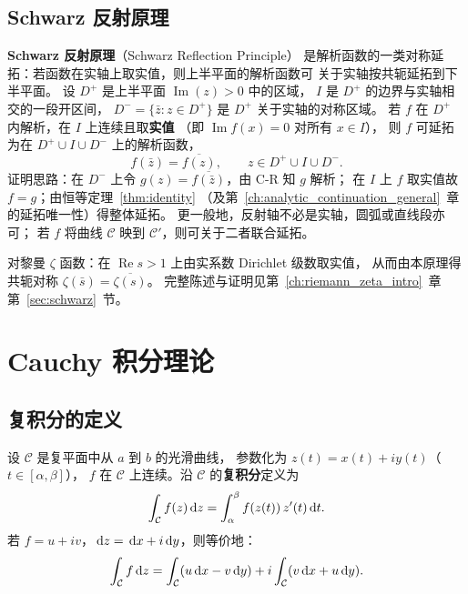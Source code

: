 \subsection{Schwarz 反射原理}\label{sec:schwarz_reflection}

\label{thm:schwarz_reflection}
\textbf{Schwarz 反射原理}（Schwarz Reflection Principle）
是解析函数的一类对称延拓：若函数在实轴上取实值，则上半平面的解析函数可
关于实轴按共轭延拓到下半平面。
设 $D^+$ 是上半平面 $\operatorname{Im}(z)>0$ 中的区域，
$I$ 是 $D^+$ 的边界与实轴相交的一段开区间，
$D^- = \{\bar{z}: z\in D^+\}$ 是 $D^+$ 关于实轴的对称区域。
若 $f$ 在 $D^+$ 内解析，在 $I$ 上连续且取\textbf{实值}
（即 $\operatorname{Im}f(x)=0$ 对所有 $x\in I$），
则 $f$ 可延拓为在 $D^+\cup I\cup D^-$ 上的解析函数，
\begin{equation}
    f(\bar{z}) = \overline{f(z)}, \qquad z\in D^+\cup I\cup D^-.
  \label{eq:schwarz_reflection}
\end{equation}
证明思路：在 $D^-$ 上令 $g(z)=\overline{f(\bar{z})}$，由 C-R 知 $g$ 解析；
在 $I$ 上 $f$ 取实值故 $f=g$；由恒等定理~\ref{thm:identity}
（及第~\ref{ch:analytic_continuation_general}~章的延拓唯一性）得整体延拓。
更一般地，反射轴不必是实轴，圆弧或直线段亦可；
若 $f$ 将曲线 $\mathcal{C}$ 映到 $\mathcal{C}'$，则可关于二者联合延拓。

对黎曼 $\zeta$ 函数：在 $\operatorname{Re}s>1$ 上由实系数 Dirichlet 级数取实值，
从而由本原理得共轭对称 $\zeta(\bar{s})=\overline{\zeta(s)}$。
完整陈述与证明见第~\ref{ch:riemann_zeta_intro}~章第~\ref{sec:schwarz}~节。

\section{Cauchy 积分理论}


\subsection{复积分的定义}

设 $\mathcal{C}$ 是复平面中从 $a$ 到 $b$ 的光滑曲线，
参数化为 $z(t)=x(t)+iy(t)$（$t\in[\alpha,\beta]$），
$f$ 在 $\mathcal{C}$ 上连续。沿 $\mathcal{C}$ 的\textbf{复积分}定义为
\begin{equation}
  \int_{\mathcal{C}} f(z)\,\mathrm{d} z
  = \int_\alpha^\beta f(z(t))\,z'(t)\,\mathrm{d} t.
  \label{eq:complex_int}
\end{equation}
若 $f=u+iv$，$\,\mathrm{d} z=\,\mathrm{d} x+i\,\mathrm{d} y$，则等价地：
\begin{equation}
  \int_{\mathcal{C}} f\,\mathrm{d} z
  = \int_{\mathcal{C}}(u\,\mathrm{d} x-v\,\mathrm{d} y)
  + i\int_{\mathcal{C}}(v\,\mathrm{d} x+u\,\mathrm{d} y).
  \label{eq:complex_int2}
\end{equation}

